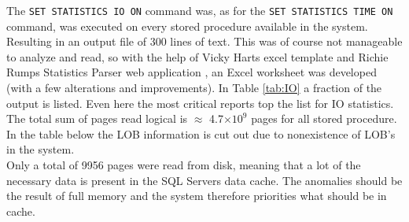 \documentclass{cslthse-msc}
\begin{document}
The \texttt{SET STATISTICS IO ON} command was, as for the \texttt{SET STATISTICS TIME ON} command, was executed on every stored procedure available in the system. Resulting in an output file of 300 lines of text. This was of course not manageable to analyze and read, so with the help of Vicky Harts excel template    \cite{Vicky} and Richie Rumps Statistics Parser web application    \cite{Rump}, an Excel worksheet was developed (with a few alterations and improvements). In Table \ref{tab:IO} a fraction of the output is listed. Even here the most critical reports top the list for IO statistics. The total sum of pages read logical is $\approx$ 4.7$\times 10^9$ pages for all stored procedure. In the table below the LOB information is cut out due to nonexistence of LOB's in the system.\\ Only a total of 9956 pages were read from disk, meaning that a lot of the necessary data is present in the SQL Servers data cache. The anomalies should be the result of full memory and the system therefore priorities what should be in cache. 
\end{document}
